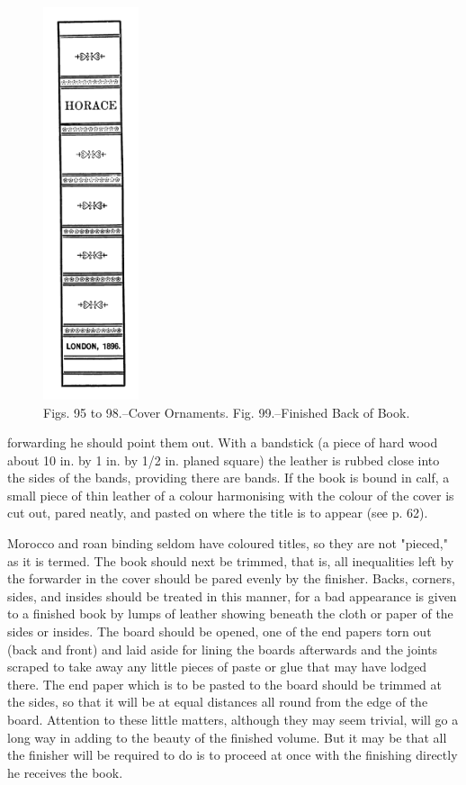 \documentclass[twoside]{book}
\begin{document}
\begin{figure}[h]
		\includegraphics[width=0.25\textwidth]{Figures/_099.png}
		\caption*{
			Figs. 95 to 98.--Cover Ornaments.
			Fig. 99.--Finished Back of Book.
		}
	\end{figure}
	\vspace*{\fill}
\pagebreak
forwarding he should point them out. With a bandstick
(a piece of hard wood about 10 in. by 1 in. by 1/2
in. planed square) the leather is rubbed close into
the sides of the bands, providing there are bands.
If the book is bound in calf, a small piece of thin
leather of a colour harmonising with the colour of
the cover is cut out, pared neatly, and pasted on
where the title is to appear (see p. 62).

Morocco and roan binding seldom have coloured
titles, so they are not "pieced," as it is termed.
The book should next be trimmed, that is, all
inequalities left by the forwarder in the cover should
be pared evenly by the finisher. Backs, corners,
sides, and insides should be treated in this manner,
for a bad appearance is given to a finished book by
lumps of leather showing beneath the cloth or paper
of the sides or insides. The board should be
opened, one of the end papers torn out (back and
front) and laid aside for lining the boards
afterwards and the joints scraped to take away any
little pieces of paste or glue that may have lodged
there. The end paper which is to be pasted to the
board should be trimmed at the sides, so that it will
be at equal distances all round from the edge of the
board. Attention to these little matters, although
they may seem trivial, will go a long way in adding
to the beauty of the finished volume. But it may be
that all the finisher will be required to do is to
proceed at once with the finishing directly he
receives the book.
\end{document}
